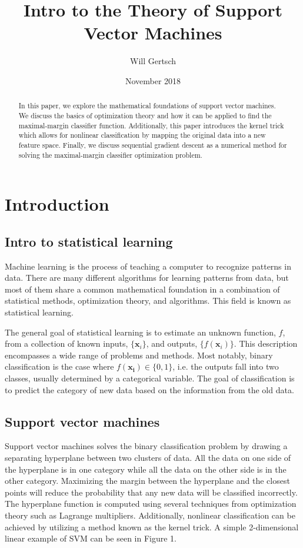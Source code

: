\documentclass{article}
\title{Intro to the Theory of Support Vector Machines}
\author{Will Gertsch}
\date{November 2018}
\begin{document}
\maketitle

\begin{abstract}
    In this paper, we explore the mathematical foundations of support vector machines. We discuss the basics of optimization theory and how it can be applied to find the maximal-margin classifier function. Additionally, this paper introduces the kernel trick which allows for nonlinear classification by mapping the original data into a new feature space. Finally, we discuss sequential gradient descent as a numerical method for solving the maximal-margin classifier optimization problem. 
\end{abstract}

\pagebreak



\section{Introduction}
\subsection{Intro to statistical learning}
Machine learning is the process of teaching a computer to recognize patterns in data. There are many different algorithms for learning patterns from data, but most of them share a common mathematical foundation in a combination of statistical methods, optimization theory, and algorithms. This field is known as statistical learning.

The general goal of statistical learning is to estimate an unknown function, $f$, from a collection of known inputs, $\{\mathbf{x}_i\}$, and outputs, $\{f(\mathbf{x}_i)\}$.  This description encompasses a wide range of problems and methods. Most notably, binary classification is the case where $f(\mathbf{x_i}) \in \{0,1\}$, i.e. the outputs fall into two classes, usually determined by a categorical variable. The goal of classification is to predict the category of new data based on the information from the old data.

\subsection{Support vector machines}
Support vector machines solves the binary classification problem by drawing a separating hyperplane between two clusters of data. All the data on one side of the hyperplane is in one category while all the data on the other side is in the other category. Maximizing the margin between the hyperplane and the closest points will reduce the probability that any new data will be classified incorrectly. The hyperplane function is computed using several techniques from optimization theory such as Lagrange multipliers. Additionally, nonlinear classification can be achieved by utilizing a method known as the kernel trick. A simple 2-dimensional linear example of SVM can be seen in Figure 1.
\end{document}
